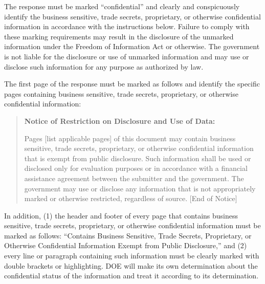 \documentclass[
]{article}
\begin{document}
The response must be marked ``confidential'' and clearly and
conspicuously identify the business sensitive, trade secrets,
proprietary, or otherwise confidential information in accordance with
the instructions below. Failure to comply with these marking
requirements may result in the disclosure of the unmarked information
under the Freedom of Information Act or otherwise. The government is not
liable for the disclosure or use of unmarked information and may use or
disclose such information for any purpose as authorized by law.

The first page of the response must be marked as follows and identify
the specific pages containing business sensitive, trade secrets,
proprietary, or otherwise confidential information:

\begin{quote}
\textbf{Notice of Restriction on Disclosure and Use of Data:}

Pages {[}list applicable pages{]} of this document may contain business
sensitive, trade secrets, proprietary, or otherwise confidential
information that is exempt from public disclosure. Such information
shall be used or disclosed only for evaluation purposes or in accordance
with a financial assistance agreement between the submitter and the
government. The government may use or disclose any information that is
not appropriately marked or otherwise restricted, regardless of source.
{[}End of Notice{]}
\end{quote}

In addition, (1) the header and footer of every page that contains
business sensitive, trade secrets, proprietary, or otherwise
confidential information must be marked as follows: ``Contains Business
Sensitive, Trade Secrets, Proprietary, or Otherwise Confidential
Information Exempt from Public Disclosure,'' and (2) every line or
paragraph containing such information must be clearly marked with double
brackets or highlighting. DOE will make its own determination about the
confidential status of the information and treat it according to its
determination.
\end{document}
